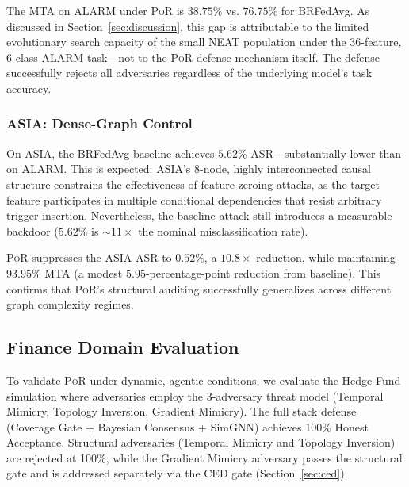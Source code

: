 \documentclass[journal]{IEEEtran}
\newcommand{\por}{\textsc{PoR}}
\begin{document}
The MTA on ALARM under \por{} is $38.75\%$ vs. $76.75\%$ for BRFedAvg.
As discussed in Section~\ref{sec:discussion}, this gap is attributable to
the limited evolutionary search capacity of the small NEAT population under
the 36-feature, 6-class ALARM task---not to the \por{} defense mechanism
itself. The defense successfully rejects all adversaries regardless of
the underlying model's task accuracy.

\subsubsection{ASIA: Dense-Graph Control}

On ASIA, the BRFedAvg baseline achieves $5.62\%$ ASR---substantially lower
than on ALARM. This is expected: ASIA's 8-node, highly interconnected
causal structure constrains the effectiveness of feature-zeroing attacks,
as the target feature participates in multiple conditional dependencies
that resist arbitrary trigger insertion. Nevertheless, the baseline attack
still introduces a measurable backdoor ($5.62\%$ is $\sim$$11\times$ the
nominal misclassification rate).

\por{} suppresses the ASIA ASR to $\mathbf{0.52\%}$, a $10.8\times$
reduction, while maintaining $93.95\%$ MTA (a modest $5.95$-percentage-point
reduction from baseline). This confirms that \por{}'s structural auditing
successfully generalizes across different graph complexity regimes.

\subsection{Finance Domain Evaluation}

To validate \por{} under dynamic, agentic conditions, we evaluate the
Hedge Fund simulation where adversaries employ the 3-adversary threat model
(Temporal Mimicry, Topology Inversion, Gradient Mimicry). The full stack
defense (Coverage Gate + Bayesian Consensus + SimGNN) achieves 100\% Honest
Acceptance. Structural adversaries (Temporal Mimicry and Topology Inversion)
are rejected at 100\%, while the Gradient Mimicry adversary passes the
structural gate and is addressed separately via the CED gate (Section~\ref{sec:ced}).
\end{document}
